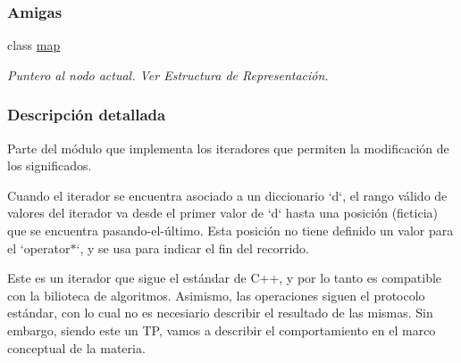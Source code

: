 \subsubsection*{\-Amigas}
\begin{DoxyCompactItemize}
\item 
class \hyperlink{classaed2_1_1iterator_1_1iterator_aeda338414e516b47761f994fb78056c6_aeda338414e516b47761f994fb78056c6}{map}
\begin{DoxyCompactList}\small\item\em \-Puntero al nodo actual. \-Ver \-Estructura de \-Representación. \end{DoxyCompactList}\end{DoxyCompactItemize}


\subsubsection{\-Descripción detallada}
\-Parte del módulo que implementa los iteradores que permiten la modificación de los significados. 

\-Cuando el iterador se encuentra asociado a un diccionario `d`, el rango válido de valores del iterador va desde el primer valor de `d` hasta una posición (ficticia) que se encuentra pasando-\/el-\/último. \-Esta posición no tiene definido un valor para el `operator$\ast$`, y se usa para indicar el fin del recorrido.

\-Este es un iterador que sigue el estándar de \-C++, y por lo tanto es compatible con la bilioteca de algoritmos. \-Asimismo, las operaciones siguen el protocolo estándar, con lo cual no es necesiario describir el resultado de las mismas. \-Sin embargo, siendo este un \-T\-P, vamos a describir el comportamiento en el marco conceptual de la materia.

